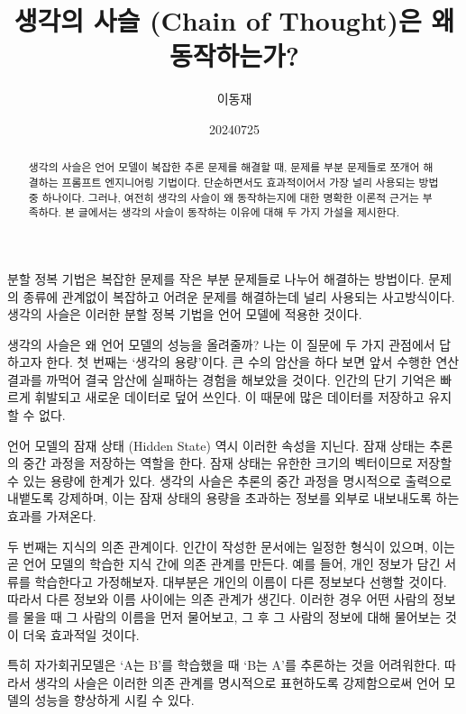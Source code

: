 \documentclass[11pt, oneside]{article}   	%
\title{생각의 사슬 (Chain of Thought)은 왜 동작하는가?}
\author{이동재}
\date{20240725}
\begin{document}
\maketitle


\begin{abstract}
  생각의 사슬은 언어 모델이 복잡한 추론 문제를 해결할 때, 문제를 부분 문제들로 쪼개어 해결하는 프롬프트 엔지니어링 기법이다. 단순하면서도 효과적이어서 가장 널리 사용되는 방법 중 하나이다. 그러나, 여전히 생각의 사슬이 왜 동작하는지에 대한 명확한 이론적 근거는 부족하다. 본 글에서는 생각의 사슬이 동작하는 이유에 대해 두 가지 가설을 제시한다.
\end{abstract}
분할 정복 기법은 복잡한 문제를 작은 부분 문제들로 나누어 해결하는 방법이다. 문제의 종류에 관계없이 복잡하고 어려운 문제를 해결하는데 널리 사용되는 사고방식이다. 생각의 사슬은 이러한 분할 정복 기법을 언어 모델에 적용한 것이다.

생각의 사슬은 왜 언어 모델의 성능을 올려줄까? 나는 이 질문에 두 가지 관점에서 답하고자 한다. 첫 번째는 `생각의 용량'이다. 큰 수의 암산을 하다 보면 앞서 수행한 연산 결과를 까먹어 결국 암산에 실패하는 경험을 해보았을 것이다. 인간의 단기 기억은 빠르게 휘발되고 새로운 데이터로 덮어 쓰인다. 이 때문에 많은 데이터를 저장하고 유지할 수 없다.

언어 모델의 잠재 상태 (Hidden State) 역시 이러한 속성을 지닌다. 잠재 상태는 추론의 중간 과정을 저장하는 역할을 한다. 잠재 상태는 유한한 크기의 벡터이므로 저장할 수 있는 용량에 한계가 있다. 생각의 사슬은 추론의 중간 과정을 명시적으로 출력으로 내뱉도록 강제하며, 이는 잠재 상태의 용량을 초과하는 정보를 외부로 내보내도록 하는 효과를 가져온다.

두 번째는 지식의 의존 관계이다. 인간이 작성한 문서에는 일정한 형식이 있으며, 이는 곧 언어 모델의 학습한 지식 간에 의존 관계를 만든다. 예를 들어, 개인 정보가 담긴 서류를 학습한다고 가정해보자. 대부분은 개인의 이름이 다른 정보보다 선행할 것이다. 따라서 다른 정보와 이름 사이에는 의존 관계가 생긴다. 이러한 경우 어떤 사람의 정보를 물을 때 그 사람의 이름을 먼저 물어보고, 그 후 그 사람의 정보에 대해 물어보는 것이 더욱 효과적일 것이다.

특히 자가회귀모델은 `A는 B'를 학습했을 때 `B는 A'를 추론하는 것을 어려워한다. 따라서 생각의 사슬은 이러한 의존 관계를 명시적으로 표현하도록 강제함으로써 언어 모델의 성능을 향상하게 시킬 수 있다.
\end{document}
